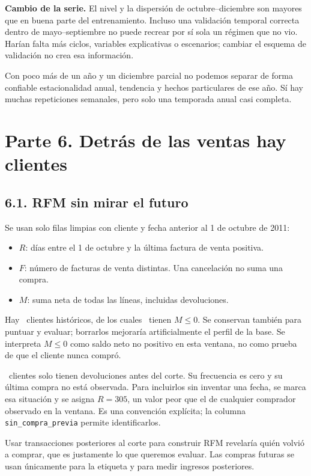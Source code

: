 \documentclass[11pt,letterpaper]{article}
\begin{document}
\textbf{Cambio de la serie.} El nivel y la dispersión de octubre--diciembre son mayores que en buena parte del entrenamiento. Incluso una validación temporal correcta dentro de mayo--septiembre no puede recrear por sí sola un régimen que no vio. Harían falta más ciclos, variables explicativas o escenarios; cambiar el esquema de validación no crea esa información.

Con poco más de un año y un diciembre parcial no podemos separar de forma confiable estacionalidad anual, tendencia y hechos particulares de ese año. Sí hay muchas repeticiones semanales, pero solo una temporada anual casi completa.

\section{Parte 6. Detrás de las ventas hay clientes}
\subsection{6.1. RFM sin mirar el futuro}
Se usan solo filas limpias con cliente y fecha anterior al 1 de octubre de 2011:
\begin{itemize}
\item $R$: días entre el 1 de octubre y la última factura de venta positiva.
\item $F$: número de facturas de venta distintas. Una cancelación no suma una compra.
\item $M$: suma neta de todas las líneas, incluidas devoluciones.
\end{itemize}
Hay \ClientesRFM\ clientes históricos, de los cuales \ClientesNoPositivos\ tienen $M\leq0$. Se conservan también para puntuar y evaluar; borrarlos mejoraría artificialmente el perfil de la base. Se interpreta $M\leq0$ como saldo neto no positivo en esta ventana, no como prueba de que el cliente nunca compró.

\SoloDevoluciones\ clientes solo tienen devoluciones antes del corte. Su frecuencia es cero y su última compra no está observada. Para incluirlos sin inventar una fecha, se marca esa situación y se asigna $R=305$, un valor peor que el de cualquier comprador observado en la ventana. Es una convención explícita; la columna \texttt{sin\_compra\_previa} permite identificarlos.

Usar transacciones posteriores al corte para construir RFM revelaría quién volvió a comprar, que es justamente lo que queremos evaluar. Las compras futuras se usan únicamente para la etiqueta y para medir ingresos posteriores.
\end{document}

